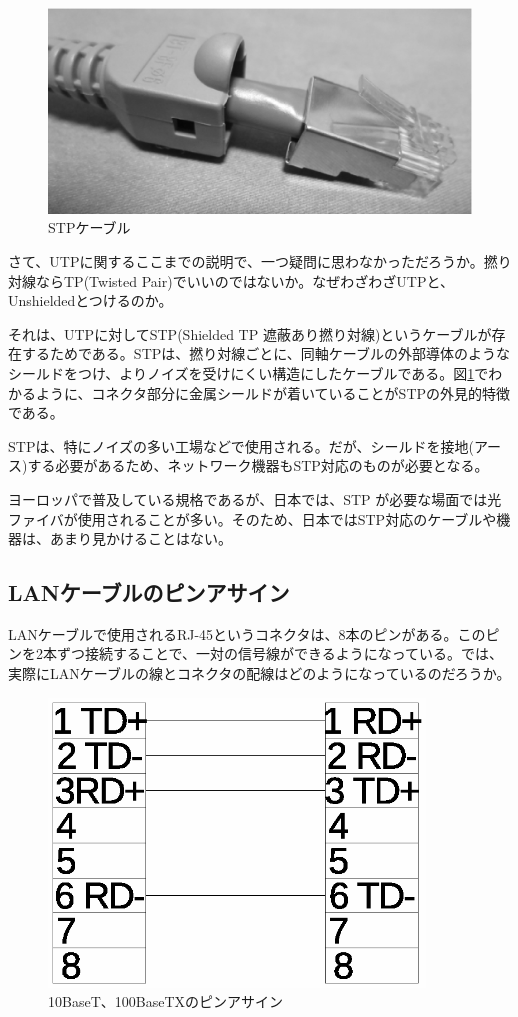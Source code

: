 \begin{figure}[htbp]
	\includegraphics[width=12cm,clip]{draw/stp.eps}
	\caption{STPケーブル}
	\label{fig:stp}
\end{figure}

さて、UTPに関するここまでの説明で、一つ疑問に思わなかっただろうか。撚り対線ならTP(Twisted Pair)でいいのではないか。なぜわざわざUTPと、Unshieldedとつけるのか。

それは、UTPに対してSTP(Shielded TP 遮蔽あり撚り対線)というケーブルが存在するためである。STPは、撚り対線ごとに、同軸ケーブルの外部導体のようなシールドをつけ、よりノイズを受けにくい構造にしたケーブルである。図\ref{fig:stp}でわかるように、コネクタ部分に金属シールドが着いていることがSTPの外見的特徴である。

STPは、特にノイズの多い工場などで使用される。だが、シールドを接地(アース)する必要があるため、ネットワーク機器もSTP対応のものが必要となる。

ヨーロッパで普及している規格であるが、日本では、STP が必要な場面では光ファイバが使用されることが多い。そのため、日本ではSTP対応のケーブルや機器は、あまり見かけることはない。

\subsection{LANケーブルのピンアサイン}

LANケーブルで使用されるRJ-45というコネクタは、8本のピンがある。このピンを2本ずつ接続することで、一対の信号線ができるようになっている。では、実際にLANケーブルの線とコネクタの配線はどのようになっているのだろうか。

\begin{figure}[htbp]
	\includegraphics[width=10cm,clip]{draw/cat5pin.eps}
	\caption{10BaseT、100BaseTXのピンアサイン}
	\label{fig:pinassign}
\end{figure}

